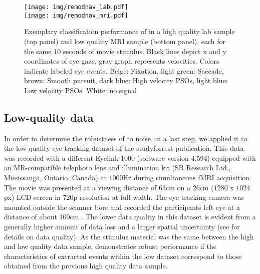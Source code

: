 \begin{figure*}[h!]
  \texttt{[image: img/remodnav\_lab.pdf]} \\
  \texttt{[image: img/remodnav\_mri.pdf]}\\
  \caption{Exemplary classification performance of \remodnav in a high quality lab sample (top panel) and low
  quality MRI sample (bottom panel), each for the same 10 seconds of movie stimulus.
  Black lines depict x and y coordinates of eye gaze, gray graph represents velocities. Colors indicate labeled
  eye events. Beige: Fixation,
  light green: Saccade, brown: Smooth pursuit, dark blue: High velocity PSOs, light blue: Low velocity PSOs.
  White: no signal}
  \label{fig:remodnav}
\end{figure*}


\subsection*{Low-quality data}\label{ana_3}

In order to determine the robustness of \remodnav to noise, in a last step, we
applied it to the low quality eye tracking dataset of the studyforrest
publication. This data was recorded with a different Eyelink 1000 (software
version 4.594) equipped with an MR-compatible telephoto lens and illumination
kit (SR Research Ltd., Mississauga, Ontario, Canada) at $1000$Hz during
simultaneous fMRI acquisition. The movie was presented at a viewing distance of
$63$cm on a 26cm ($1280$ x $1024$px) LCD screen in 720p resolution at full
width. The eye tracking camera was mounted outside the scanner bore and
recorded the participants left eye at a distance of about 100cm
\citep{Hanke2016}.  The lower data quality in this dataset is evident from a
generally higher amount of data loss and a larger spatial uncertainty (see
\citet{Hanke2016} for details on data quality). As the stimulus material was
the same between the high and low quality data sample, \remodnav demonstrates
robust performance if the characteristics of extracted events within the low
dataset correspond to those obtained from the previous high quality data
sample.

